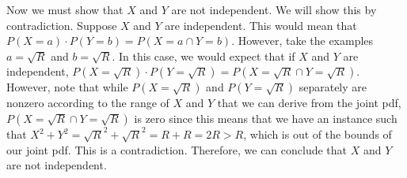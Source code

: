 \documentclass{article}
\begin{document}
{Now we must show that $X$ and $Y$ are not independent. We will show this by contradiction. Suppose $X$ and $Y$ are independent. This would mean that $P(X = a) \cdot P(Y = b) = P(X = a \cap Y = b)$. However, take the examples $a = \sqrt{R}$ and $b = \sqrt{R}$. In this case, we would expect that if  $X$ and $Y$ are independent, $P(X = \sqrt{R}) \cdot P(Y = \sqrt{R}) = P(X = \sqrt{R} \cap Y = \sqrt{R})$. However, note that while $P(X = \sqrt{R})$ and $P(Y = \sqrt{R})$ separately are nonzero according to the range of $X$ and $Y$ that we can derive from the joint pdf, $P(X = \sqrt{R} \cap Y = \sqrt{R})$ is zero since this means that we have an instance such that $X^2 + Y^2 = \sqrt{R}^2 + \sqrt{R}^2 = R + R = 2R > R$, which is out of the bounds of our joint pdf. This is a contradiction. Therefore, we can conclude that $X$ and $Y$ are not independent.

}
\end{document}
